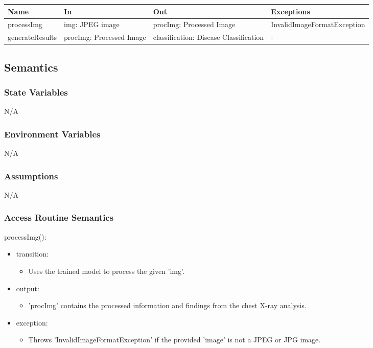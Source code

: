 \documentclass[12pt, titlepage]{article}
\begin{document}
\begin{center}
\begin{tabular}{p{3cm} p{4cm} p{4cm} p{5cm}}
\hline
\textbf{Name} & \textbf{In} & \textbf{Out} & \textbf{Exceptions} \\
\hline
processImg & img: JPEG image & procImg: Processed Image & InvalidImageFormatException \\
generateResults & procImg: Processed Image & classification: Disease Classification & - \\
\hline
\end{tabular}
\end{center}

\subsection{Semantics}

\subsubsection{State Variables}
N/A
\subsubsection{Environment Variables}
N/A
\subsubsection{Assumptions}
N/A
\subsubsection{Access Routine Semantics}

\noindent processImg():
\begin{itemize}
\item transition: \begin{itemize}
    \item Uses the trained model to process the given 'img'.
\end{itemize}
\item output: \begin{itemize}
    \item 'procImg' contains the processed information and findings from the chest X-ray analysis.
\end{itemize}
\item exception: \begin{itemize}
    \item Throws ’InvalidImageFormatException’ if the provided ’image’ is not a JPEG or JPG image.
\end{itemize} 
\end{itemize}
\end{document}
